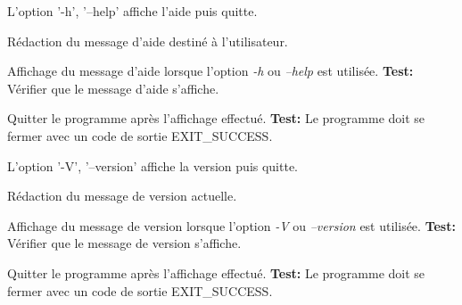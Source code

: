 \documentclass{article}
\begin{document}
\begin{needbox}
    L'option '-h', '--help' affiche l'aide puis quitte.
    \begin{subneedbox}[F16.1: Texte]
        Rédaction du message d'aide destiné à l'utilisateur.
    \end{subneedbox}
    \begin{subneedbox}[F16.2: Affichage]
        Affichage du message d'aide lorsque l'option \textit{-h} ou \textit{--help} est utilisée.
        \textbf{Test:} Vérifier que le message d'aide s'affiche.
    \end{subneedbox}
    \begin{subneedbox}[F16.3: Quitter]
        Quitter le programme après l'affichage effectué.
        \textbf{Test:} Le programme doit se fermer avec un code de sortie EXIT\_SUCCESS.
    \end{subneedbox}
\end{needbox}

\begin{needbox}[F17: Version]
    L'option '-V', '--version' affiche la version puis quitte.
    \begin{subneedbox}[F17.1: Texte]
        Rédaction du message de version actuelle.
    \end{subneedbox}
    \begin{subneedbox}[F17.2: Affichage]
        Affichage du message de version lorsque l'option \textit{-V} ou \textit{--version} est utilisée.
        \textbf{Test:} Vérifier que le message de version s'affiche.
    \end{subneedbox}
    \begin{subneedbox}[F17.3: Quitter]
        Quitter le programme après l'affichage effectué.
        \textbf{Test:} Le programme doit se fermer avec un code de sortie EXIT\_SUCCESS.
    \end{subneedbox}
    
\end{needbox}
\end{document}
